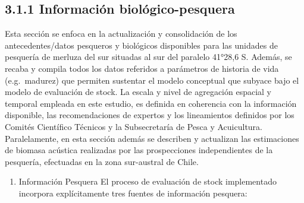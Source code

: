 \documentclass[
  spanish,
]{article}
\providecommand{\tightlist}{%
  \setlength{\itemsep}{0pt}\setlength{\parskip}{0pt}}
\begin{document}
\hypertarget{informaciuxf3n-bioluxf3gico-pesquera}{%
\subsection{3.1.1 Información
biológico-pesquera}\label{informaciuxf3n-bioluxf3gico-pesquera}}

Esta sección se enfoca en la actualización y consolidación de los
antecedentes/datos pesqueros y biológicos disponibles para las unidades
de pesquería de merluza del sur situadas al sur del paralelo 41°28,6 S.
Además, se recaba y compila todos los datos referidos a parámetros de
historia de vida (e.g.~madurez) que permiten sustentar el modelo
conceptual que subyace bajo el modelo de evaluación de stock. La escala
y nivel de agregación espacial y temporal empleada en este estudio, es
definida en coherencia con la información disponible, las
recomendaciones de expertos y los lineamientos definidos por los Comités
Científico Técnicos y la Subsecretaría de Pesca y Acuicultura.
Paralelamente, en esta sección además se describen y actualizan las
estimaciones de biomasa acústica realizadas por las prospecciones
independientes de la pesquería, efectuadas en la zona sur-austral de
Chile.

\begin{enumerate}
\def\labelenumi{\roman{enumi}.}
\tightlist
\item
  Información Pesquera El proceso de evaluación de stock implementado
  incorpora explícitamente tres fuentes de información pesquera:
\end{enumerate}
\end{document}
